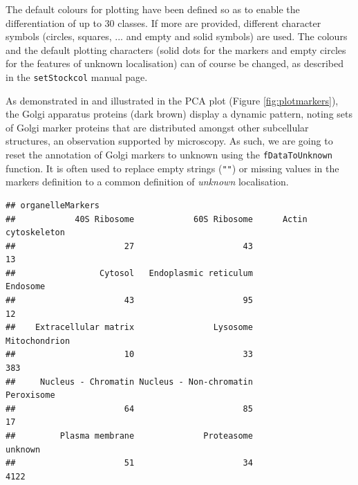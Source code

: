 The default colours for plotting have been defined so as to enable the
differentiation of up to 30 classes. If more are provided, different
character symbols (circles, squares, ... and empty and solid symbols)
are used. The colours and the default plotting characters (solid dots
for the markers and empty circles for the features of unknown
localisation) can of course be changed, as described in the
\texttt{setStockcol} manual page.

As demonstrated in \cite{hyper} and illustrated in the PCA plot
(Figure \ref{fig:plotmarkers}), the Golgi apparatus proteins (dark
brown) display a dynamic pattern, noting sets of Golgi marker proteins
that are distributed amongst other subcellular structures, an
observation supported by microscopy.  As such, we are going to reset
the annotation of Golgi markers to unknown using the
\texttt{fDataToUnknown} function. It is often used to replace empty
strings (\texttt{""}) or missing values in the markers definition to a
common definition of \textit{unknown} localisation.

\begin{knitrout}
\color{fgcolor}\begin{kframe}
\begin{alltt}
 \hlkwb{<-}   \hlstd{=} \hlstd{,}  \hlstd{=} \hlstd{)}
\end{alltt}
\begin{verbatim}
## organelleMarkers
##            40S Ribosome            60S Ribosome      Actin cytoskeleton 
##                      27                      43                      13 
##                 Cytosol   Endoplasmic reticulum                Endosome 
##                      43                      95                      12 
##    Extracellular matrix                Lysosome           Mitochondrion 
##                      10                      33                     383 
##     Nucleus - Chromatin Nucleus - Non-chromatin              Peroxisome 
##                      64                      85                      17 
##         Plasma membrane              Proteasome                 unknown 
##                      51                      34                    4122
\end{verbatim}
\end{kframe}
\end{knitrout}

